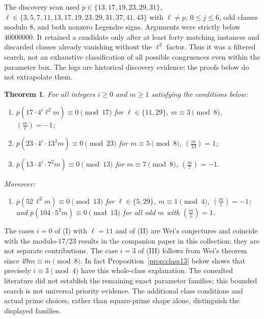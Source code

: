 \documentclass[11pt]{article}
\newtheorem{theorem}{Theorem}\newtheorem{lemma}[theorem]{Lemma}\newtheorem{proposition}[theorem]{Proposition}
\theoremstyle{remark}\newtheorem{remark}[theorem]{Remark}
\newcommand{\pb}{\overline{p}}
\newcommand{\leg}[2]{\left(\frac{#1}{#2}\right)}
\begin{document}
The discovery scan used $p\in\{13,17,19,23,29,31\}$, $\ell\in\{3,5,7,11,13,17,19,23,29,31,37,41,43\}$ with $\ell\ne p$, $0\le j\le6$, odd classes modulo $8$, and both nonzero Legendre signs. Arguments were strictly below $40000000$. It retained a candidate only after at least forty matching instances and discarded classes already vanishing without the $\ell^2$ factor. Thus it was a filtered search, not an exhaustive classification of all possible congruences even within the parameter box. The logs are historical discovery evidence; the proofs below do not extrapolate them.

\begin{theorem}\label{thm:main}
For all integers $i\ge0$ and $m\ge1$ satisfying the conditions below:
\begin{enumerate}
\item[(I)] $\pb(17\cdot4^i\ell^2m)\equiv0\pmod{17}$ for $\ell\in\{11,29\}$, $m\equiv3\pmod8$, $\leg m\ell=-1$;
\item[(II)] $\pb(23\cdot4^i\cdot13^2m)\equiv0\pmod{23}$ for $m\equiv5\pmod8$, $\leg m{13}=1$;
\item[(III)] $\pb(13\cdot4^i\cdot7^2m)\equiv0\pmod{13}$ for $m\equiv7\pmod8$, $\leg m7=-1$.
\end{enumerate}
Moreover:
\begin{enumerate}
\item[(IV)] $\pb(52\,\ell^2m)\equiv0\pmod{13}$ for $\ell\in\{5,29\}$, $m\equiv1\pmod4$, $\leg m\ell=-1$; and $\pb(104\cdot5^2m)\equiv0\pmod{13}$ for all odd $m$ with $\leg m5=1$.
\end{enumerate}
\end{theorem}

The cases $i=0$ of (I) with $\ell=11$ and of (II) are Wei's conjectures and coincide with the modulo-$17/23$ results in the companion paper in this collection; they are not separate contributions. The case $i=3$ of (III) follows from Wei's theorem since $49m\equiv m\pmod8$. In fact Proposition~\ref{prop:class13} below shows that precisely $i\equiv3\pmod4$ have this whole-class explanation. The consulted literature did not establish the remaining exact parameter families; this bounded search is not universal priority evidence. The additional class conditions and actual prime choices, rather than square-prime shape alone, distinguish the displayed families.
\end{document}
